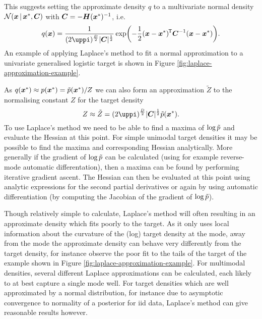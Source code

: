 This suggests setting the approximate density $q$ to a multivariate normal density $\nrm{\vct{x} \gvn \vct{x}^*,\mtx{C}}$ with $\boldsymbol{C} = -\boldsymbol{H}(\boldsymbol{x}^*)^{-1}$, i.e.
\begin{equation}\label{eq:laplace-approximation}
  q(\vct{x}) = 
  \frac{1}{(2\uppi)^{\frac{D}{2}}|\mtx{C}|^{\frac{1}{2}}} 
  \exp\lpa-\frac{1}{2}(\vct{x}-\vct{x}^*)\tr\mtx{C}^{-1}(\vct{x}-\vct{x}^*)\rpa.
\end{equation}
An example of applying Laplace's method to fit a normal approximation to a univariate generalised logistic target is shown in Figure \ref{fig:laplace-approximation-example}.

As $q(\boldsymbol{x}^*) \approx p(\boldsymbol{x}^*) = \tilde{p}(\boldsymbol{x}^*) / Z$ we can also form an approximation $\tilde{Z}$ to the normalising constant $Z$ for the target density
\begin{equation}\label{eq:laplace-approximation-normalising-const}
  Z \approx \tilde{Z} = (2\uppi)^{\frac{D}{2}} |\mtx{C}|^{\frac{1}{2}}\utgtdens(\vct{x}^*).
\end{equation}
To use Laplace's method we need to be able to find a maxima of $\log\tilde{p}$ and evaluate the Hessian at this point. For simple unimodal target densities it may be possible to find the maxima and corresponding Hessian analytically. More generally if the gradient of $\log\tilde{p}$ can be calculated (using for example reverse-mode automatic differentation), then a maxima can be found by performing iterative gradient ascent. The Hessian can then be evaluated at this point using analytic expressions for the second partial derivatives or again by using automatic differentiation (by computing the Jacobian of the gradient of $\log\tilde{p}$).

Though relatively simple to calculate, Laplace's method will often resulting in an approximate density which fits poorly to the target. As it only uses local information about the curvature of the (log) target density at the mode, away from the mode the approximate density can behave very differently from the target density, for instance observe the poor fit to the tails of the target of the example shown in Figure \ref{fig:laplace-approximation-example}. For multimodal densities, several different Laplace approximations can be calculated, each likely to at best capture a single mode well. For target densities which are well approximated by a normal distribution, for instance due to asymptotic convergence to normality of a posterior for \ac{iid} data, Laplace's method can give reasonable results however. 

